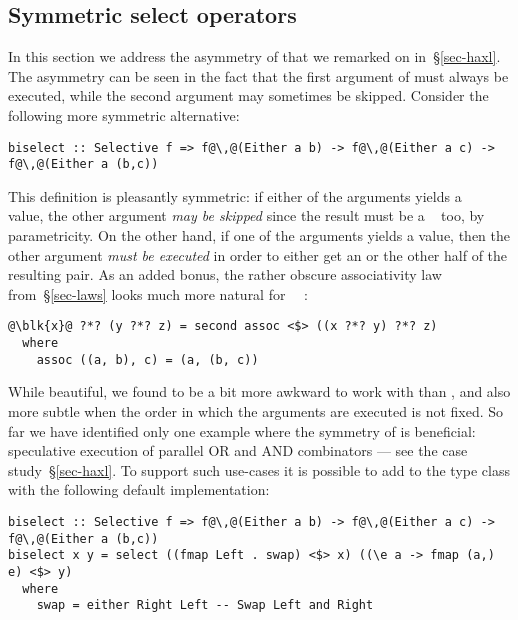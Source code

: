\subsection{Symmetric select operators}\label{sec-alt-symmetric}

In this section we address the asymmetry of  that we remarked on
in~\S\ref{sec-haxl}. The asymmetry can be seen in the fact that the first
argument of  must always be executed, while the second argument may
sometimes be skipped. Consider the following more symmetric alternative:

\begin{verbatim}
biselect :: Selective f => f@\,@(Either a b) -> f@\,@(Either a c) -> f@\,@(Either a (b,c))
\end{verbatim}

\noindent
This definition is pleasantly symmetric: if either of the arguments yields a
~ value, the other argument \emph{may be skipped} since the
result must be a ~ too, by parametricity. On the other hand, if
one of the arguments yields a  value, then the other argument
\emph{must be executed} in order to either get an  or the other half of
the resulting pair. As an added bonus, the rather obscure associativity law
from~\S\ref{sec-laws} looks much more natural for
~\hs{=}~:

\vspace{0.5mm}
\begin{verbatim}
@\blk{x}@ ?*? (y ?*? z) = second assoc <$> ((x ?*? y) ?*? z)
  where
    assoc ((a, b), c) = (a, (b, c))
\end{verbatim}
\vspace{0.5mm}

\noindent
While beautiful, we found  to be a bit more awkward to work with
than , and also more subtle when the order in which the arguments
are executed is not fixed. So far we have identified only one example where the
symmetry of  is beneficial: speculative execution of parallel OR
and AND combinators --- see the \Haxl case study~\S\ref{sec-haxl}. To support
such use-cases it is possible to add  to the  type
class with the following default implementation:

\vspace{0.5mm}
\begin{verbatim}
biselect :: Selective f => f@\,@(Either a b) -> f@\,@(Either a c) -> f@\,@(Either a (b,c))
biselect x y = select ((fmap Left . swap) <$> x) ((\e a -> fmap (a,) e) <$> y)
  where
    swap = either Right Left -- Swap Left and Right
\end{verbatim}
\vspace{0.5mm}

